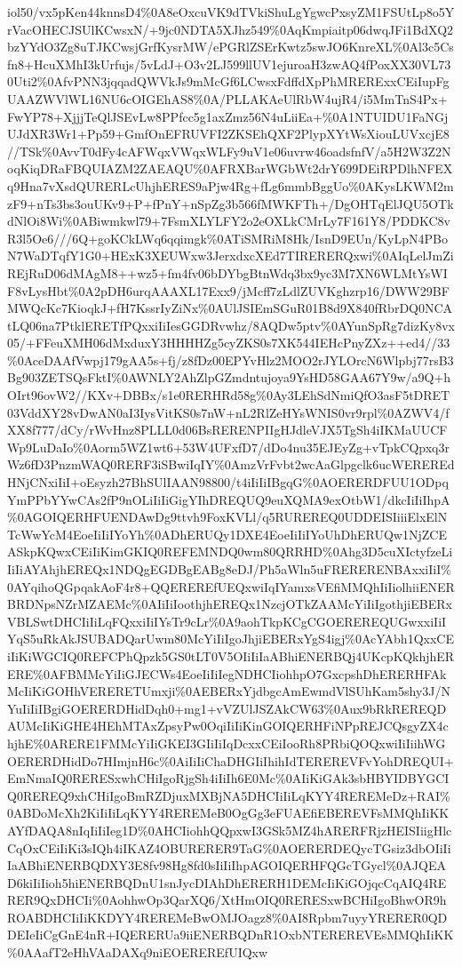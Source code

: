 \documentclass[]{article}
\begin{document}
iol50/vx5pKen44knnsD4\%0A8eOxcuVK9dTVkiShuLgYgwcPxsyZM1FSUtLp8o5YrVacOHECJSUlKCwsxN/+9jc0NDTA5XJhz549\%0AqKmpiaitp06dwqJFi1BdXQ2bzYYdO3Zg8uTJKCwsjGrfKysrMW/ePGRlZSErKwtz5swJO6KnreXL\%0Al3c5Csfn8+HcuXMhI3kUrfujs/5vLdJ+O3v2LJ599llUV1ejuroaH3zwAQ4fPoxXX30VL730Uti2\%0AfvPNN3jqqadQWVkJs9mMcGf6LCwsxFdffdXpPhMRERExxCEiIupFgUAAZWVlWL16NU6cOIGEhAS8\%0A/PLLAKAeUlRbW4ujR4/i5MmTnS4Px+FwYP78+XjjjTeQlJSEvLw8PPfcc5g1axZmz56N4uLiiEa+\%0A1NTUIDU1FaNGjUJdXR3Wr1+Pp59+GmfOnEFRUVFI2ZKSEhQXF2PlypXYtWsXiouLUVxcjE8//TSk\%0AvvT0dFy4cAFWqxVWqxWLFy9uV1e06uvrw46oadsfnfV/a5H2W3Z2NoqKiqDRaFBQUIAZM2ZAEAQU\%0AFRXBarWGbWt2drY699DEiRPDlhNFEXq9Hna7vXsdQURERLcUhjhERES9aPjw4Rg+fLg6mmbBggUo\%0AKysLKWM2mzF9+nTs3bs3ouUKv9+P+fPnY+nSpZg3b566fMWKFTh+/DgOHTqElJQU5OTkdNlOi8Wi\%0ABiwmkwl79+7FsmXLYLFY2o2eOXLkCMrLy7F161Y8/PDDKC8vR3l5Oe6///6Q+goKCkLWq6qqimgk\%0ATiSMRiM8Hk/IsnD9EUn/KyLpN4PBoN7WaDTqfY1G0+HExK3XEUWxw3JerxdxcXEd7TIRERERQxwi\%0AIqLelJmZiREjRuD06dMAgM8++wz5+fm4fv06bDYbgBtnWdq3bx9yc3M7XN6WLMtYsWIF8vLysHbt\%0A2pDH6urqAAAXL17Exx9/jMcff7zLdlZUVKghzrp16/DWW29BFMWQcKc7KioqkJ+fH7KssrIyZiNx\%0AUlJSIEmSGuR01B8d9X840fRbrDQ0NCAtLQ06na7PtklERETfPQxxiIiIesGGDRvwhz/8AQDw5ptv\%0AYunSpRg7dizKy8vx05/+FFeuXMH06dMxduxY3HHHHZg5cyZKS0s7XK544IEHcPnyZXz++ed4//33\%0AceDAAfVwpj179gAA5s+fj/z8fDz00EPYvHlz2MOO2rJYLOrcN6Wlpbj77rsB3Bg903ZETSQsFktI\%0AWNLY2AhZlpGZmdntujoya9YsHD58GAA67Y9w/a9Q+hOIrt96ovW2//KXv+DBBx/s1e0RERHRd58g\%0Ay3LEhSdNmiQfO3asF5tDRET03VddXY28vDwAN0aI3IysVitKS0s7nW+nL2RlZeHYsWNIS0vr9rpl\%0AZWV4/fXX8f777/dCy/rWvHnz8PLLL0d06BsRERENPIIgHJdleVJX5TgSh4iIKMaUUCFWp9LuDaIo\%0Aorm5WZ1wt6+53W4UFxfD7/dDo4nu35EJEyZg+vTpkCQpxq3rWz6fD3PnzmWAQ0RERF3iSBwiIqIY\%0AmzVrFvbt2wcAaGlpgclk6ucWEREREdHNjCNxiIiI+oEsyzh27BhSUlIAAN98800/t4iIiIiIBgqG\%0AOERERDFUU1ODpqYmPPbYYwCAs2fP9nOLiIiIiGigYIhDREQUQ9euXQMA9exOtbW1/dkcIiIiIhpA\%0AGOIQERHFUENDAwDg9ttvh9FoxKVLl/q5RUREREQ0UDDEISIiiiElxElNTcWwYcM4EoeIiIiIYoYh\%0ADhERUQy1DXE4EoeIiIiIYoUhDhERUQw1NjZCEASkpKQwxCEiIiKimGKIQ0REFEMNDQ0wm80QRRHD\%0Ahg3D5cuXIctyfzeLiIiIiAYAhjhEREQx1NDQgEGDBgEABg8eDJ/Ph5aWln5uFRERERENBAxxiIiI\%0AYqihoQGpqakAoF4r8+QQEREREfUEQxwiIqIYamxsVEfiMMQhIiIiolhiiENERBRDNpsNZrMZAEMc\%0AIiIiIoothjhEREQx1NzcjOTkZAAMcYiIiIgothjiEBERxVBLSwtDHCIiIiLqFQxxiIiIYsTr9cLr\%0A9aohTkpKCgCGOEREREQUGwxxiIiIYqS5uRkAkJSUBADQarUwm80McYiIiIgoJhjiEBERxYgS4igj\%0AcYAbh1QxxCEiIiKiWGCIQ0REFCPhQpzk5GS0tLT0V5OIiIiIaABhiENERBQj4UKcpKQkhjhERERE\%0AFBMMcYiIiGJECWs4EoeIiIiIegNDHCIiohhpO7GxcpshDhERERHFAkMcIiKiGOHhVERERETUmxji\%0AEBERxYjdbgcAmEwmdVlSUhKam5shy3J/NYuIiIiIBgiGOERERDHidDqh0+mg1+vVZUlJSZAkCW63\%0Aux9bRkREREQDAUMcIiKiGHE4HEhMTAxZpsyPw0OqiIiIiKinGOIQERHFiNPpREJCQsgyZX4chjhE\%0ARERE1FMMcYiIiGKEI3GIiIiIqDcxxCEiIooRh8PRbiQOQxwiIiIiihWGOERERDHidDo7HImjnH6c\%0AiIiIiChaDHGIiIhihIdTEREREVFvYohDREQUI+EmNmaIQ0RERESxwhCHiIgoRjgSh4iIiIh6E0Mc\%0AIiKiGAk3sbHBYIDBYGCIQ0REREQ9xhCHiIgoBmRZDjuxMXBjNA5DHCIiIiLqKYY4REREMeDz+RAI\%0ABDoMcXh2KiIiIiLqKYY4REREMeB0OgGg3eFUAEfiEBEREVFsMMQhIiKKAYfDAQA8nIqIiIiIeg1D\%0AHCIiohhQQpxwI3GSk5MZ4hARERFRjzHEISIiigHlcCqOxCEiIiKi3sIQh4iIKAZ4OBURERER9TaG\%0AOERERDEQycTGsiz3dbOIiIiIaABhiENERBQDXY3E8fv98Hg8fd0sIiIiIhpAGOIQERHFQGcTGycl\%0AJQEAD6kiIiIioh5hiENERBQDnU1snJycDIAhDhERERH1DEMcIiKiGOjqcCqAIQ4RERER9QxDHCIi\%0AohhwOp3QarXQ6/XtHmOIQ0RERESxwBCHiIgoBhwOR9hROABDHCIiIiKKDYY4REREMeBwOMJOagz8\%0AI8Rpbm7uyyYRERER0QDDEIeIiCgGnE4nR+IQERERUa9iiENERBQDnR1OxbNTEREREVEsMMQhIiKK\%0AAafT2eHhVAaDAXq9niEOEREREfUIQxw
\end{document}
